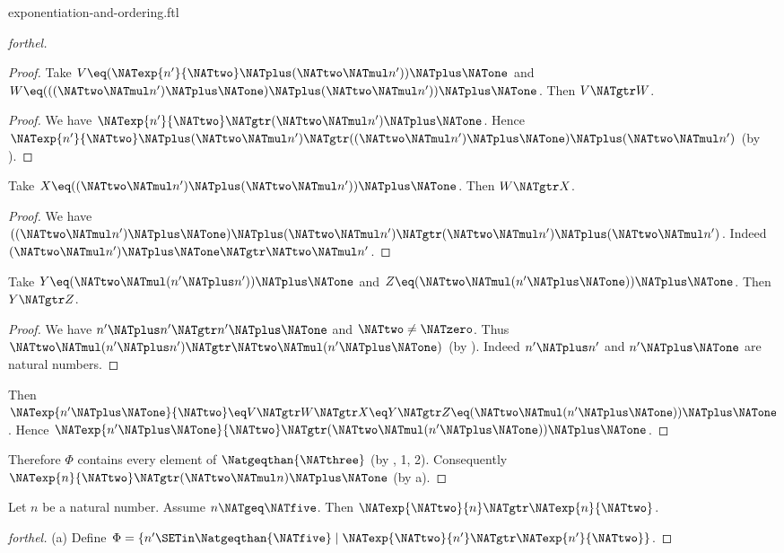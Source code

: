 \documentclass{naproche-library}
\begin{document}
\begin{smodule}[title=Exponentiation and Ordering]{exponentiation-and-ordering.ftl}
\begin{proof}[forthel]
\begin{proof}
    Take $V \eq (\NATexp{n'}{\NATtwo} \NATplus (\NATtwo \NATmul n')) \NATplus \NATone$ and $W \eq (((\NATtwo \NATmul n') \NATplus \NATone) \NATplus (\NATtwo \NATmul n')) \NATplus \NATone$.
    Then $V \NATgtr W$.
    \begin{proof}
      We have $\NATexp{n'}{\NATtwo} \NATgtr (\NATtwo \NATmul n') \NATplus \NATone$.
      Hence $\NATexp{n'}{\NATtwo} \NATplus (\NATtwo \NATmul n') \NATgtr ((\NATtwo \NATmul n') \NATplus \NATone) \NATplus (\NATtwo \NATmul n')$ (by ).
    \end{proof}

    Take $X \eq ((\NATtwo \NATmul n') \NATplus (\NATtwo \NATmul n')) \NATplus \NATone$.
    Then $W \NATgtr X$.
    \begin{proof}
      We have $((\NATtwo \NATmul n') \NATplus \NATone) \NATplus (\NATtwo \NATmul n') \NATgtr (\NATtwo \NATmul n') \NATplus (\NATtwo \NATmul n')$.
      Indeed $(\NATtwo \NATmul n') \NATplus \NATone \NATgtr \NATtwo \NATmul n'$.
    \end{proof}

    Take $Y \eq (\NATtwo \NATmul (n' \NATplus n')) \NATplus \NATone$ and $Z \eq (\NATtwo \NATmul (n' \NATplus \NATone)) \NATplus \NATone$.
    Then $Y \NATgtr Z$.
    \begin{proof}
      We have $n' \NATplus n' \NATgtr n' \NATplus \NATone$ and $\NATtwo \neq \NATzero$.
      Thus $\NATtwo \NATmul (n' \NATplus n') \NATgtr \NATtwo \NATmul (n' \NATplus \NATone)$ (by ).
      Indeed $n' \NATplus n'$ and $n' \NATplus \NATone$ are natural numbers.
    \end{proof}

    Then $\NATexp{n' \NATplus \NATone}{\NATtwo} \eq V \NATgtr W \NATgtr X \eq Y \NATgtr Z \eq (\NATtwo \NATmul (n' \NATplus \NATone)) \NATplus \NATone$.
    Hence $\NATexp{n' \NATplus \NATone}{\NATtwo} \NATgtr (\NATtwo \NATmul (n' \NATplus \NATone)) \NATplus \NATone$.
  \end{proof}

  Therefore $\Phi$ contains every element of $\Natgeqthan{\NATthree}$ (by , 1, 2).
  Consequently $\NATexp{n}{\NATtwo} \NATgtr (\NATtwo \NATmul n) \NATplus \NATone$ (by a).
\end{proof}

\begin{proposition}[forthel,id=ARITHMETIC_09_1097950367318016]
  Let $n$ be a natural number.
  Assume $n \NATgeq \NATfive$.
  Then $\NATexp{\NATtwo}{n} \NATgtr \NATexp{n}{\NATtwo}$.
\end{proposition}
\begin{proof}[forthel]
  (a) Define $\Phi = \{ n' \SETin \Natgeqthan{\NATfive} \mid \NATexp{\NATtwo}{n'} \NATgtr \NATexp{n'}{\NATtwo} \}$.


\end{proof}
\end{smodule}
\end{document}
